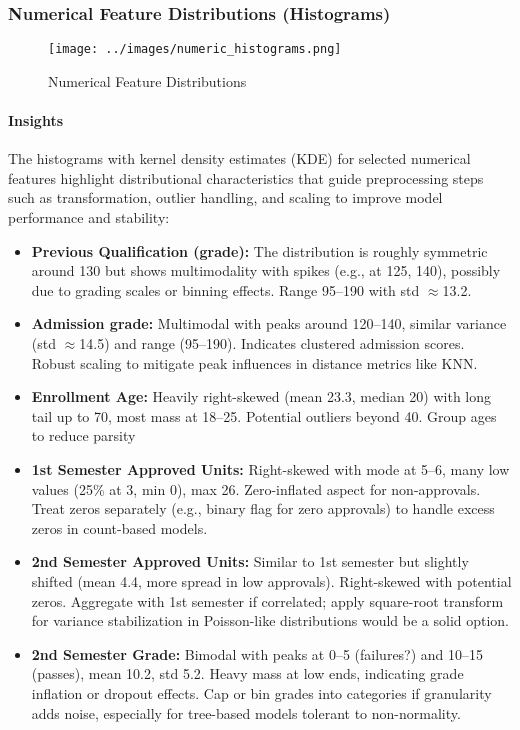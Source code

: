\documentclass[twoside,final]{hcmut-report}
\begin{document}
\subsubsection{Numerical Feature Distributions (Histograms)}
\begin{figure}[H]
  \centering
  \texttt{[image: ../images/numeric\_histograms.png]}
  \caption{Numerical Feature Distributions}
  \label{num_dist_his}
\end{figure}

\paragraph*{Insights}

The histograms with kernel density estimates (KDE) for selected numerical features highlight distributional characteristics that guide preprocessing steps such as transformation, outlier handling, and scaling to improve model performance and stability:
\begin{itemize}
  \item \textbf{Previous Qualification (grade):} The distribution is roughly symmetric around 130 but shows multimodality with spikes (e.g., at 125, 140), possibly due to grading scales or binning effects. Range 95--190 with std $\approx$13.2.
  \item \textbf{Admission grade:} Multimodal with peaks around 120--140, similar variance (std $\approx$14.5) and range (95--190). Indicates clustered admission scores. Robust scaling to mitigate peak influences in distance metrics like KNN.
  \item \textbf{Enrollment Age:} Heavily right-skewed (mean 23.3, median 20) with long tail up to 70, most mass at 18--25. Potential outliers beyond 40. Group ages to reduce parsity
  \item \textbf{1st Semester Approved Units:} Right-skewed with mode at 5--6, many low values (25\% at 3, min 0), max 26. Zero-inflated aspect for non-approvals. Treat zeros separately (e.g., binary flag for zero approvals) to handle excess zeros in count-based models.
  \item \textbf{2nd Semester Approved Units:} Similar to 1st semester but slightly shifted (mean 4.4, more spread in low approvals). Right-skewed with potential zeros. Aggregate with 1st semester if correlated; apply square-root transform for variance stabilization in Poisson-like distributions would be a solid option.
  \item \textbf{2nd Semester Grade:} Bimodal with peaks at 0--5 (failures?) and 10--15 (passes), mean 10.2, std 5.2. Heavy mass at low ends, indicating grade inflation or dropout effects. Cap or bin grades into categories if granularity adds noise, especially for tree-based models tolerant to non-normality.
\end{itemize}
\end{document}

